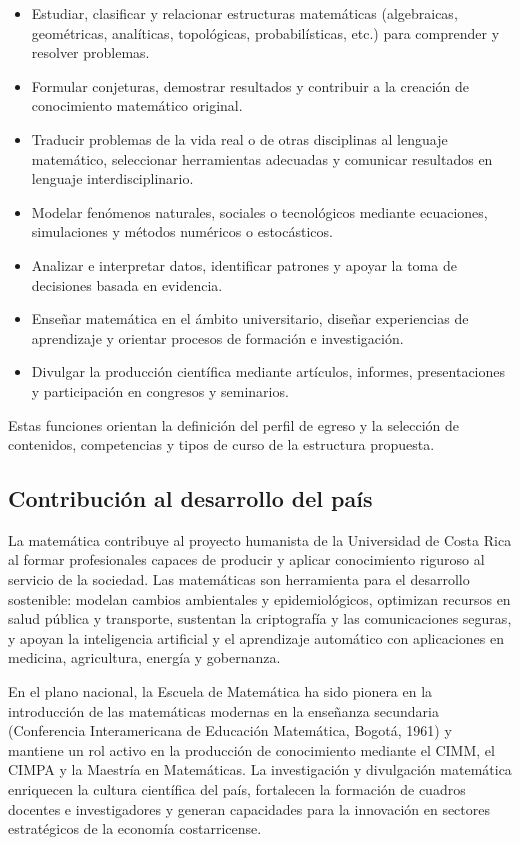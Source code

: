 \begin{itemize}
  \item Estudiar, clasificar y relacionar estructuras matemáticas (algebraicas, geométricas, analíticas, topológicas, probabilísticas, etc.) para comprender y resolver problemas.
  \item Formular conjeturas, demostrar resultados y contribuir a la creación de conocimiento matemático original.
  \item Traducir problemas de la vida real o de otras disciplinas al lenguaje matemático, seleccionar herramientas adecuadas y comunicar resultados en lenguaje interdisciplinario.
  \item Modelar fenómenos naturales, sociales o tecnológicos mediante ecuaciones, simulaciones y métodos numéricos o estocásticos.
  \item Analizar e interpretar datos, identificar patrones y apoyar la toma de decisiones basada en evidencia.
  \item Enseñar matemática en el ámbito universitario, diseñar experiencias de aprendizaje y orientar procesos de formación e investigación.
  \item Divulgar la producción científica mediante artículos, informes, presentaciones y participación en congresos y seminarios.
\end{itemize}

Estas funciones orientan la definición del perfil de egreso y la selección de contenidos, competencias y tipos de curso de la estructura propuesta.


\subsection{Contribución al desarrollo del país}

La matemática contribuye al proyecto humanista de la Universidad de Costa Rica al formar profesionales capaces de producir y aplicar conocimiento riguroso al servicio de la sociedad. Las matemáticas son herramienta para el desarrollo sostenible: modelan cambios ambientales y epidemiológicos, optimizan recursos en salud pública y transporte, sustentan la criptografía y las comunicaciones seguras, y apoyan la inteligencia artificial y el aprendizaje automático con aplicaciones en medicina, agricultura, energía y gobernanza.

En el plano nacional, la Escuela de Matemática ha sido pionera en la introducción de las matemáticas modernas en la enseñanza secundaria (Conferencia Interamericana de Educación Matemática, Bogotá, 1961) y mantiene un rol activo en la producción de conocimiento mediante el CIMM, el CIMPA y la Maestría en Matemáticas. La investigación y divulgación matemática enriquecen la cultura científica del país, fortalecen la formación de cuadros docentes e investigadores y generan capacidades para la innovación en sectores estratégicos de la economía costarricense.

